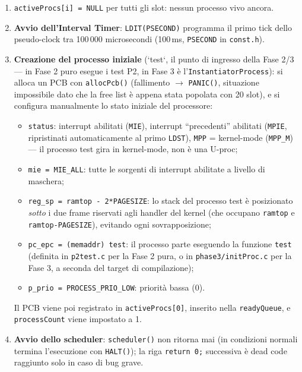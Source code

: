 \documentclass[11pt,a4paper]{article}
\newcommand{\code}[1]{\texttt{#1}}
\begin{document}
\begin{enumerate}
\item \code{activeProcs[i] = NULL} per tutti gli slot: nessun processo vivo
  ancora.

\item \textbf{Avvio dell'Interval Timer}: \code{LDIT(PSECOND)} programma il
  primo tick dello pseudo-clock tra 100\,000 microsecondi (100\,ms,
  \code{PSECOND} in \code{const.h}).

\item \textbf{Creazione del processo iniziale} (`test`, il punto di ingresso
  della Fase 2/3 --- in Fase 2 puro esegue i test P2, in Fase 3 è
  l'\code{InstantiatorProcess}): si alloca un PCB con \code{allocPcb()}
  (fallimento $\to$ \code{PANIC()}, situazione impossibile dato che la free
  list è appena stata popolata con 20 slot), e si configura manualmente lo
  stato iniziale del processore:
  \begin{itemize}
  \item \code{status}: interrupt abilitati (\code{MIE}), interrupt
    ``precedenti'' abilitati (\code{MPIE}, ripristinati automaticamente al
    primo \code{LDST}), \code{MPP} = kernel-mode (\code{MPP\_M}) --- il
    processo test gira in kernel-mode, non è una U-proc;
  \item \code{mie = MIE\_ALL}: tutte le sorgenti di interrupt abilitate a
    livello di maschera;
  \item \code{reg\_sp = ramtop - 2*PAGESIZE}: lo stack del processo test è
    posizionato \emph{sotto} i due frame riservati agli handler del kernel
    (che occupano \code{ramtop} e \code{ramtop-PAGESIZE}), evitando ogni
    sovrapposizione;
  \item \code{pc\_epc = (memaddr) test}: il processo parte eseguendo la
    funzione \code{test} (definita in \code{p2test.c} per la Fase 2 pura, o
    in \code{phase3/initProc.c} per la Fase 3, a seconda del target di
    compilazione);
  \item \code{p\_prio = PROCESS\_PRIO\_LOW}: priorità bassa (0).
  \end{itemize}
  Il PCB viene poi registrato in \code{activeProcs[0]}, inserito nella
  \code{readyQueue}, e \code{processCount} viene impostato a 1.

\item \textbf{Avvio dello scheduler}: \code{scheduler()} non ritorna mai
  (in condizioni normali termina l'esecuzione con \code{HALT()}); la riga
  \code{return 0;} successiva è dead code raggiunto solo in caso di bug
  grave.
\end{enumerate}
\end{document}
